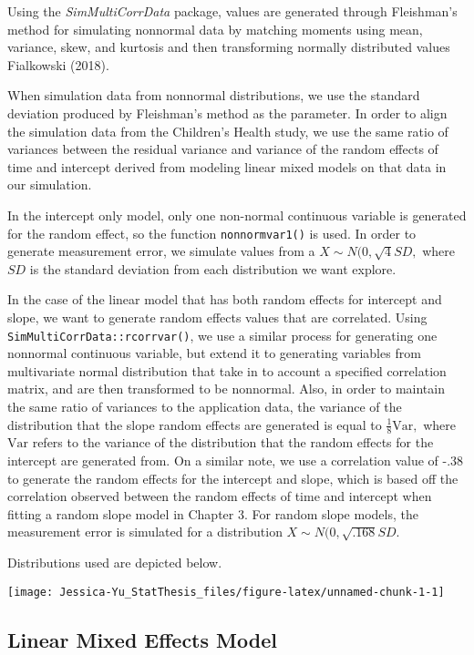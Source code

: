 \documentclass[12pt, twoside]{amherstthesis}
\begin{document}
Using the \emph{SimMultiCorrData} package, values are generated through Fleishman's method for simulating nonnormal data by matching moments using mean, variance, skew, and kurtosis and then transforming normally distributed values Fialkowski (2018).

When simulation data from nonnormal distributions, we use the standard deviation produced by Fleishman's method as the parameter. In order to align the simulation data from the Children's Health study, we use the same ratio of variances between the residual variance and variance of the random effects of time and intercept derived from modeling linear mixed models on that data in our simulation.

In the intercept only model, only one non-normal continuous variable is generated for the random effect, so the function \texttt{nonnormvar1()} is used. In order to generate measurement error, we simulate values from a \(X\sim\mathit{N}(0,\sqrt{4}SD,\) where \(SD\) is the standard deviation from each distribution we want explore.

In the case of the linear model that has both random effects for intercept and slope, we want to generate random effects values that are correlated. Using \texttt{SimMultiCorrData::rcorrvar()}, we use a similar process for generating one nonnormal continuous variable, but extend it to generating variables from multivariate normal distribution that take in to account a specified correlation matrix, and are then transformed to be nonnormal. Also, in order to maintain the same ratio of variances to the application data, the variance of the distribution that the slope random effects are generated is equal to \(\frac{1}{8}\text{Var},\) where \(\text{Var}\) refers to the variance of the distribution that the random effects for the intercept are generated from. On a similar note, we use a correlation value of -.38 to generate the random effects for the intercept and slope, which is based off the correlation observed between the random effects of time and intercept when fitting a random slope model in Chapter 3. For random slope models, the measurement error is simulated for a distribution \(X\sim\mathit{N}(0,\sqrt{.168}SD.\)

Distributions used are depicted below.
\begin{center}\texttt{[image: Jessica-Yu\_StatThesis\_files/figure-latex/unnamed-chunk-1-1]} \end{center}

\hypertarget{linear-mixed-effects-model}{%
\subsection{Linear Mixed Effects Model}\label{linear-mixed-effects-model}}
\end{document}
